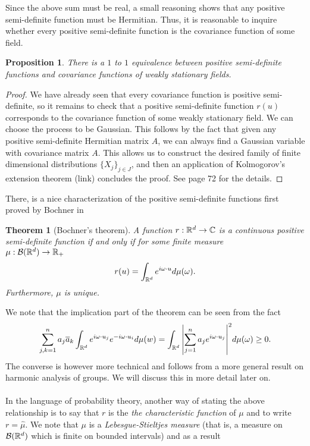 \documentclass[12pt]{article}
\newtheorem{theorem}{Theorem}
\newtheorem{proposition}{Proposition}
\begin{document}
Since the above sum must be real, a small reasoning  shows that any positive semi-definite function must be Hermitian. Thus, it is reasonable to inquire whether every positive semi-definite function is the covariance function of some field.
\begin{proposition}
    There is a $1$ to  $1$ equivalence between positive semi-definite functions and  covariance functions of weakly stationary fields.
\end{proposition}
\begin{proof}
    We have already seen that every covariance function is positive semi-definite, so it remains to check that a positive semi-definite function $r(u)$ corresponds to the  covariance function of some weakly stationary field. We can choose the process to be Gaussian. This follows by the fact that given any positive semi-definite Hermitian matrix $A$,  we can always find a Gaussian variable with covariance matrix $A$. This allows us to construct the desired family of finite dimensional distributions $\{X_j\}_{j \in  J}$, and then an application of Kolmogorov's extension theorem (link) concludes the proof. See \cite{lindgren2012stationary} page 72 for the details.
\end{proof}
There, is a nice characterization of the positive semi-definite functions first proved by Bochner in \cite{bochner1933monotone}
\begin{theorem}[Bochner's theorem]\label{Bochner's theorem}
    A function $r:{\mathbb R}^d\to \mathbb{C}$ is a continuous positive semi-definite function if and only if for some finite measure\\ $\mu:\mathcal{B}({\mathbb R}^d)\to {\mathbb R}_+$
    \begin{equation*}
        r(u)=\int_{{\mathbb R}^d} e^{i\omega\cdot u}d\mu (\omega).
    \end{equation*}
    Furthermore, $\mu $ is unique.
\end{theorem}
We note that the implication part of the theorem can be seen from the fact
\begin{equation*}
    \sum_{j,k=1}^{n} a_j \overline{a}_k\int_{{\mathbb R}^d} e^{i\omega\cdot u_j}e^{-i\omega\cdot u_i} d\mu(w)=\int_{{\mathbb R}^d}\abs{\sum_{j=1}^{n} a_j e^{i\omega\cdot u_j}}^2d\mu(\omega)\geq 0.
\end{equation*}
The converse is however more technical and follows from a more general result on harmonic analysis of groups. We will discuss this in more detail later on.\\
\\
In the language of probability theory, another way of stating the above relationship is to say that $r$ is the  \emph{the characteristic function} of $\mu $ and to write $r=\hat{\mu}$. We note that $\mu $ is a \emph{Lebesgue-Stieltjes measure} (that is, a measure on $\mathcal{B}({\mathbb R}^d)$ which is finite on bounded intervals) and as a result
\end{document}
